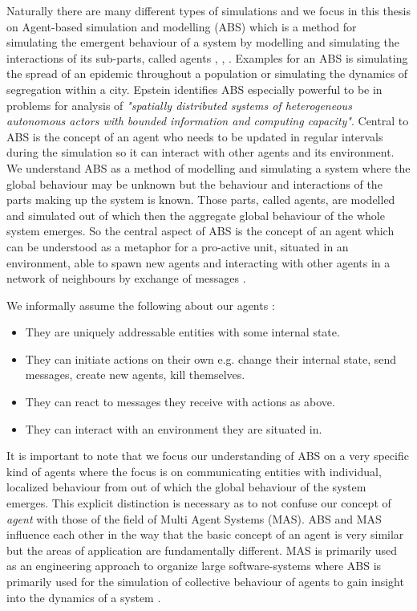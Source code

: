 Naturally there are many different types of simulations and we focus in this thesis on Agent-based simulation and modelling (ABS) which is a method for simulating the emergent behaviour of a system by modelling and simulating the interactions of its sub-parts, called agents \cite{siebers_introduction_2008}, \cite{axelrod_guide_2006}, \cite{wilensky_introduction_2015}. Examples for an ABS is simulating the spread of an epidemic throughout a population or simulating the dynamics of segregation within a city. Epstein \cite{epstein_generative_2012} identifies ABS especially powerful to be in problems for analysis of \textit{"spatially distributed systems of heterogeneous autonomous actors with bounded information and computing capacity"}. Central to ABS is the concept of an agent who needs to be updated in regular intervals during the simulation so it can interact with other agents and its environment.
We understand ABS as a method of modelling and simulating a system where the global behaviour may be unknown but the behaviour and interactions of the parts making up the system is known. Those parts, called agents, are modelled and simulated out of which then the aggregate global behaviour of the whole system emerges. So the central aspect of ABS is the concept of an agent which can be understood as a metaphor for a pro-active unit, situated in an environment, able to spawn new agents and interacting with other agents in a network of neighbours by exchange of messages \cite{wooldridge_introduction_2009}.

We informally assume the following about our agents \cite{wooldridge_intelligent_1995}:

\begin{itemize}
	\item They are uniquely addressable entities with some internal state.
	\item They can initiate actions on their own e.g. change their internal state, send messages, create new agents, kill themselves.
	\item They can react to messages they receive with actions as above.
	\item They can interact with an environment they are situated in.
\end{itemize} 

It is important to note that we focus our understanding of ABS on a very specific kind of agents where the focus is on communicating entities with individual, localized behaviour from out of which the global behaviour of the system emerges. This explicit distinction is necessary as to not confuse our concept of \textit{agent} with those of the field of Multi Agent Systems (MAS). ABS and MAS influence each other in the way that the basic concept of an agent is very similar but the areas of application are fundamentally different. MAS is primarily used as an engineering approach to organize large software-systems \cite{weiss_multiagent_2013} where ABS is primarily used for the simulation of collective behaviour of agents to gain insight into the dynamics of a system \cite{dawson_opening_2014}.

